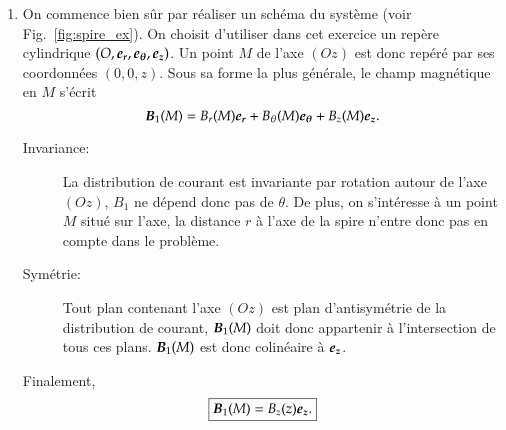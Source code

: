 \begin{corrige} 
	\begin{enumerate}
		\item On commence bien sûr par réaliser un schéma du système
			(voir Fig.~\ref{fig:spire_ex}).
		      On choisit d'utiliser dans cet exercice un repère cylindrique
		      $(O, \er, \etheta, \ez)$. Un point $M$ de l'axe $(Oz)$
		      est donc repéré par ses coordonnées $(0, 0, z)$. Sous
		      sa forme la plus générale, le champ magnétique en $M$ 
		      s'écrit 
		      \begin{equation*}
			      \vecb_1(M) = B_r(M) \er + B_\theta(M) \etheta +
			      B_z(M) \ez.
		      \end{equation*}

		      \begin{description}
			     \item[Invariance:] La distribution de courant est 
			     invariante par rotation autour de l'axe $(Oz)$, 
			     $B_1$ ne dépend donc pas de $\theta$. De plus, on 
			     s'intéresse à un point $M$ situé sur l'axe, la
			     distance $r$ à l'axe de la spire n'entre donc pas
			     en compte dans le problème.
		     \item[Symétrie: ] Tout plan contenant l'axe $(Oz)$ est 
			               plan d'antisymétrie de la distribution de courant,
				       $\vecb_1(M)$ doit donc appartenir à l'intersection
				       de tous ces plans. $\vecb_1(M)$ est donc colinéaire
				       à $\ez$.
		     \end{description}
		     Finalement,
		     \begin{equation*}
			     \boxed{\vecb_1(M) = B_z(z) \ez.}
		     \end{equation*}
		

\end{enumerate}
\end{corrige}
